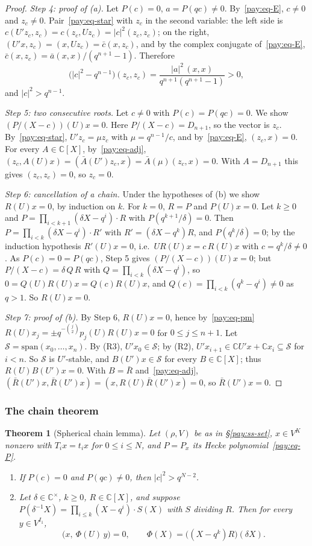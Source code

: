 \documentclass[10pt]{amsart}
\newtheorem{theorem}{Theorem}[section]
\theoremstyle{definition}
\theoremstyle{remark}
\newcommand{\C}{\mathbb C}
\begin{document}
\begin{proof}
\emph{Step 4: proof of (a).} Let $P(c)=0$, $a=P(qc)\ne0$. By~\eqref{pay:eq-E}, $c\ne0$ and $z_c\ne0$.
Pair~\eqref{pay:eq-star} with $z_c$ in the second variable: the left side is $c(U'z_c,z_c)=c(z_c,Uz_c)
=|c|^2(z_c,z_c)$; on the right, $(U'x,z_c)=(x,Uz_c)=\bar c(x,z_c)$, and by the complex conjugate
of~\eqref{pay:eq-E}, $\bar c(x,z_c)=\bar a(x,x)/(q^{n+1}-1)$. Therefore
\[
\bigl(|c|^2-q^{n-1}\bigr)(z_c,z_c)=\frac{|a|^2\,(x,x)}{q^{n+1}(q^{n+1}-1)}>0 ,
\]
and $|c|^2>q^{n-1}$.

\emph{Step 5: two consecutive roots.} Let $c\ne0$ with $P(c)=P(qc)=0$. We show $(P/(X-c))(U)x=0$.
Here $P/(X-c)=D_{n+1}$, so the vector is $z_c$. By~\eqref{pay:eq-star}, $U'z_c=\mu z_c$ with $\mu=
q^{n-1}/c$, and by~\eqref{pay:eq-E}, $(z_c,x)=0$. For every $A\in\C[X]$, by~\eqref{pay:eq-adj},
$(z_c,A(U)x)=(\bar A(U')z_c,x)=\bar A(\mu)(z_c,x)=0$. With $A=D_{n+1}$ this gives $(z_c,z_c)=0$, so
$z_c=0$.

\emph{Step 6: cancellation of a chain.} Under the hypotheses of (b) we show $R(U)x=0$, by induction
on $k$. For $k=0$, $R=P$ and $P(U)x=0$. Let $k\ge0$ and $P=\prod_{i<k+1}(\delta X-q^i)\cdot R$ with
$P(q^{k+1}/\delta)=0$. Then $P=\prod_{i<k}(\delta X-q^i)\cdot R'$ with $R'=(\delta X-q^k)R$, and $P(q^k/\delta)=0$; by the
induction hypothesis $R'(U)x=0$, i.e.\ $UR(U)x=c\,R(U)x$ with $c=q^k/\delta\ne0$. As $P(c)=0=P(qc)$, Step 5
gives $(P/(X-c))(U)x=0$; but $P/(X-c)=\delta\,Q\,R$ with $Q=\prod_{i<k}(\delta X-q^i)$, so $0=Q(U)R(U)x=Q(c)R(U)x$,
and $Q(c)=\prod_{i<k}(q^k-q^i)\ne0$ as $q>1$. So $R(U)x=0$.

\emph{Step 7: proof of (b).} By Step 6, $R(U)x=0$, hence by~\eqref{pay:eq-pm} $R(U)x_j=\pm q^{-\binom
j2}p_j(U)R(U)x=0$ for $0\le j\le n+1$. Let $\mathcal S=\mathrm{span}(x_0,\dots,x_n)$. By (R3), $U'x_0\in \mathcal S$; by
(R2), $U'x_{i+1}\in\C U'x+\C x_i\subseteq \mathcal S$ for $i<n$. So $\mathcal S$ is $U'$-stable, and $B(U')x\in \mathcal S$ for
every $B\in\C[X]$; thus $R(U)B(U')x=0$. With $B=\bar R$ and~\eqref{pay:eq-adj},
$(\bar R(U')x,\bar R(U')x)=(x,R(U)\bar R(U')x)=0$, so $\bar R(U')x=0$.
\end{proof}

\subsubsection{The chain theorem}\label{pay:ss-thm}

\begin{theorem}[Spherical chain lemma]\label{pay:chain}
Let $(\rho,V)$ be as in \S\ref{pay:ss-set}, $x\in V^K$ nonzero with $T_ix=t_ix$ for $0\le i\le N$, and
$P=P_x$ its Hecke polynomial~\eqref{pay:eq-P}.
\begin{enumerate}
\item[(i)] If $P(c)=0$ and $P(qc)\ne0$, then $|c|^2>q^{N-2}$.
\item[(ii)] Let $\delta\in\C^\times$, $k\ge0$, $R\in\C[X]$, and suppose $P(\delta^{-1}X)=\prod_{i\le k}(X-q^i)
\cdot S(X)$ with $S$ dividing $R$. Then for every $y\in V^{I_1}$,
\[
\bigl(x,\ \Phi(U)\,y\bigr)=0,\qquad\Phi(X)=\bigl((X-q^k)R\bigr)(\delta X).
\]
\end{enumerate}
\end{theorem}
\end{document}
